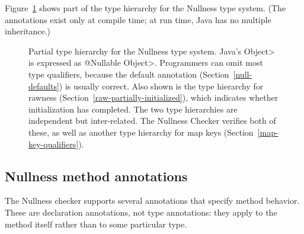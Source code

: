 Figure~\ref{fig:nonnull-hierarchy} shows part of the type hierarchy for the
Nullness type system.
(The annotations exist only at compile time; at run time, Java has no
multiple inheritance.)

\begin{figure}
\caption{Partial type hierarchy for the Nullness type system.
Java's \<Object> is expressed as \<@Nullable Object>.  Programmers can omit
most type qualifiers, because the default annotation
(Section~\ref{null-defaults}) is usually correct.  Also shown is the
type hierarchy for rawness (Section~\ref{raw-partially-initialized}), which
indicates whether
initialization has completed.  The two type hierarchies are independent but
inter-related.  The Nullness Checker verifies both of these, as well as
another type hierarchy for map keys (Section~\ref{map-key-qualifiers}).}
\label{fig:nonnull-hierarchy}
\end{figure}


\subsection{Nullness method annotations\label{nullness-non-qualifiers}}

The Nullness checker supports several annotations that specify method
behavior.  These are declaration annotations, not type annotations:  they
apply to the method itself rather than to some particular type.

